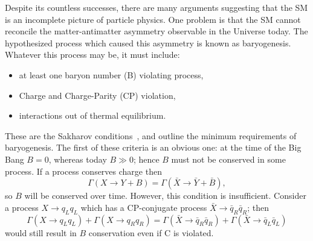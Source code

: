 Despite its countless successes,
there are many arguments suggesting that the SM is an incomplete
picture of particle physics.
One problem is that the SM cannot reconcile the matter-antimatter asymmetry observable in the
Universe today.
The hypothesized process which caused this asymmetry is known as baryogenesis.
Whatever this process may be, it must include:
\begin{itemize}
  \item at least one baryon number (B) violating process,
  \item Charge and Charge-Parity (CP) violation,
  \item interactions out of thermal equilibrium.
\end{itemize}
These are the Sakharov conditions~\cite{1991SvPhU..34..392S}, and outline the minimum requirements
of baryogenesis.
The first of these criteria is an obvious one: at the time of the Big Bang $B=0$, whereas today
$B\gg0$; hence $B$ must not be conserved in some process.
If a process conserves charge then
\begin{equation}
  \Gamma(X\to Y+B)=\Gamma(\bar X \to \bar Y+\bar B),
\end{equation}
so $B$ will be conserved over time.
However, this condition is insufficient.
Consider a process $X\to q_Lq_L$ which has a CP-conjugate process $\bar X\to \bar q_R\bar q_R$;
then
\begin{equation}
  \Gamma(X\to q_Lq_L) + \Gamma(X\to q_Rq_R)
  =
  \Gamma(\bar X\to \bar q_R\bar q_R) + \Gamma(\bar X\to \bar q_L\bar q_L)
\end{equation}
would still result in $B$ conservation even if C is violated.
